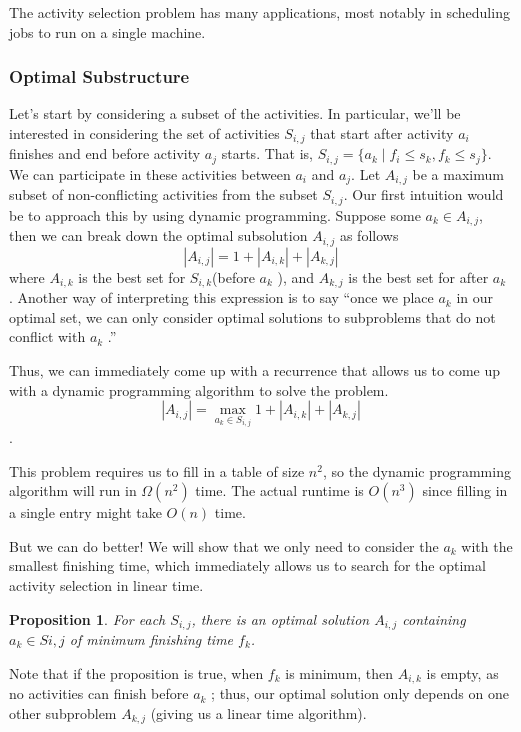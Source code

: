 \documentclass [12pt]{article}
\newtheorem{proposition}{Proposition}
\theoremstyle{definition}
\begin{document}
The activity selection problem has many applications, most notably in scheduling jobs to run on a single machine.

\subsubsection{Optimal Substructure} 

Let's start by considering a subset of the activities. In particular, we'll be interested in
considering the set of activities $S_{i ,j}$ that start after activity $a_i$ finishes and end before activity $a_j$ starts. That is, $S_{i ,j} = \{a_k \mid f_i \leq s_k , f_k \leq s_j\}$. We can participate in these activities between $a_i$ and $a_j$. Let $A_{i ,j}$ be a maximum subset of non-conflicting activities from the subset $S_{i ,j}$. Our first intuition would be to approach this by using dynamic programming. Suppose some $a_k \in A_{i ,j}$, then we can break down the optimal subsolution $A_{i ,j}$ as follows 
$$
|A_{i ,j}| = 1 + |A_{i ,k} | + |A_{k ,j}| 
$$
where $A_{i ,k}$ is the best set for $S_{i ,k}$(before $a_k$ ), and $A_{k ,j}$ is the best set for after $a_k$ . Another way of interpreting this expression is to say ``once we place $a_k$ in our optimal set, we can only consider optimal solutions to subproblems that do not conflict with $a_k$ .''

Thus, we can immediately come up with a recurrence that allows us to come up with a dynamic programming algorithm to solve the problem. 
$$
|A_{i ,j}| = \max_{a_k \in S_{i ,j}} 1 + |A_{i ,k} | + |A_{k ,j}|
$$.

This problem requires us to fill in a table of size $n^2$, so the dynamic programming algorithm will run in $\Omega(n^2)$ time. The actual runtime is $O(n^3)$ since filling in a single entry might take $O(n)$ time. 

But we can do better! We will show that we only need to consider the $a_k$ with the smallest finishing time, which immediately allows us to search for the optimal activity selection in linear time.

\begin{proposition}For each $S_{i ,j}$, there is an optimal solution $A_{i ,j}$ containing $a_k \in Si ,j$ of minimum finishing time $f_k$.
\end{proposition}
 

Note that if the proposition is true, when $f_k$ is minimum, then $A_{i ,k}$ is empty, as no activities can finish before $a_k$ ; thus, our optimal solution only depends on one other subproblem $A_{k ,j}$ (giving us a linear time algorithm). 
\end{document}
